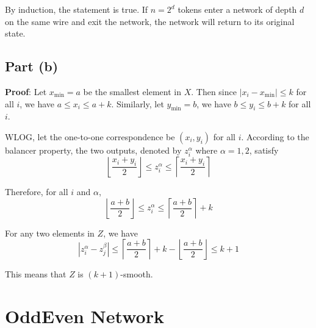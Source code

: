 \documentclass{article}
\begin{document}
By induction, the statement is true. If $n=2^d$ tokens enter a network of depth $d$ on the same wire and exit the network, the network will return to its original state.

\subsection{Part (b)}
\noindent\textbf{Proof}:
Let $x_{\min}=a$ be the smallest element in $X$. Then since $|x_i-x_{\min}|\leqslant k$ for all $i$, we have $a\leqslant x_i\leqslant a+k$. Similarly, let $y_{\min}=b$, we have $b\leqslant y_i\leqslant b+k$ for all $i$.

WLOG, let the one-to-one correspondence be $(x_i,y_i)$ for all $i$. According to the balancer property, the two outputs, denoted by $z_i^\alpha$ where $\alpha=1,2$, satisfy
\begin{equation*}
\left\lfloor\frac{x_i+y_i}{2}\right\rfloor\leqslant z_i^\alpha\leqslant\left\lceil\frac{x_i+y_i}{2}\right\rceil
\end{equation*}

Therefore, for all $i$ and $\alpha$,
\begin{equation*}
\left\lfloor\frac{a+b}{2}\right\rfloor\leqslant z_i^\alpha\leqslant\left\lceil\frac{a+b}{2}\right\rceil+k
\end{equation*}

For any two elements in $Z$, we have
\begin{equation*}
|z_i^\alpha-z_j^\beta|\leqslant\left\lceil\frac{a+b}{2}\right\rceil+k-\left\lfloor\frac{a+b}{2}\right\rfloor\leqslant k+1
\end{equation*}

This means that $Z$ is $(k+1)$-smooth.

\section{OddEven Network}
\end{document}
